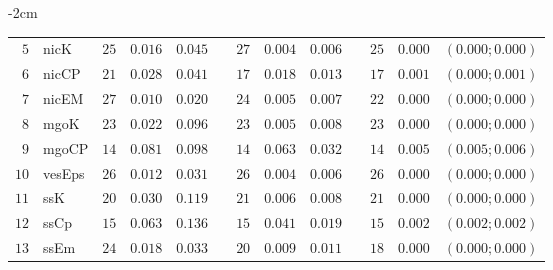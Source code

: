\begin{table*}[!htbp]
\begin{adjustwidth*}{}{-2cm}
\begin{tabular}{@{}rlrrrrrrrrrcc@{}}
\footnotesize{$5 $} & \footnotesize{nicK     } & \footnotesize{$25$} & \footnotesize{$0.016$} & \footnotesize{$0.045$} && \footnotesize{$27$} & \footnotesize{$0.004$} & \footnotesize{$0.006$} && \footnotesize{$25$} & \footnotesize{$0.000$} & \footnotesize{$(0.000;0.000)$} \\
\footnotesize{$6 $} & \footnotesize{nicCP    } & \footnotesize{$21$} & \footnotesize{$0.028$} & \footnotesize{$0.041$} && \footnotesize{$17$} & \footnotesize{$0.018$} & \footnotesize{$0.013$} && \footnotesize{$17$} & \footnotesize{$0.001$} & \footnotesize{$(0.000;0.001)$} \\
\footnotesize{$7 $} & \footnotesize{nicEM    } & \footnotesize{$27$} & \footnotesize{$0.010$} & \footnotesize{$0.020$} && \footnotesize{$24$} & \footnotesize{$0.005$} & \footnotesize{$0.007$} && \footnotesize{$22$} & \footnotesize{$0.000$} & \footnotesize{$(0.000;0.000)$} \\
\footnotesize{$8 $} & \footnotesize{mgoK     } & \footnotesize{$23$} & \footnotesize{$0.022$} & \footnotesize{$0.096$} && \footnotesize{$23$} & \footnotesize{$0.005$} & \footnotesize{$0.008$} && \footnotesize{$23$} & \footnotesize{$0.000$} & \footnotesize{$(0.000;0.000)$} \\
\footnotesize{$9 $} & \footnotesize{mgoCP    } & \footnotesize{$14$} & \footnotesize{$0.081$} & \footnotesize{$0.098$} && \footnotesize{$14$} & \footnotesize{$0.063$} & \footnotesize{$0.032$} && \footnotesize{$14$} & \footnotesize{$0.005$} & \footnotesize{$(0.005;0.006)$} \\
\footnotesize{$10$} & \footnotesize{vesEps   } & \footnotesize{$26$} & \footnotesize{$0.012$} & \footnotesize{$0.031$} && \footnotesize{$26$} & \footnotesize{$0.004$} & \footnotesize{$0.006$} && \footnotesize{$26$} & \footnotesize{$0.000$} & \footnotesize{$(0.000;0.000)$} \\
\footnotesize{$11$} & \footnotesize{ssK      } & \footnotesize{$20$} & \footnotesize{$0.030$} & \footnotesize{$0.119$} && \footnotesize{$21$} & \footnotesize{$0.006$} & \footnotesize{$0.008$} && \footnotesize{$21$} & \footnotesize{$0.000$} & \footnotesize{$(0.000;0.000)$} \\
\footnotesize{$12$} & \footnotesize{ssCp     } & \footnotesize{$15$} & \footnotesize{$0.063$} & \footnotesize{$0.136$} && \footnotesize{$15$} & \footnotesize{$0.041$} & \footnotesize{$0.019$} && \footnotesize{$15$} & \footnotesize{$0.002$} & \footnotesize{$(0.002;0.002)$} \\
\footnotesize{$13$} & \footnotesize{ssEm     } & \footnotesize{$24$} & \footnotesize{$0.018$} & \footnotesize{$0.033$} && \footnotesize{$20$} & \footnotesize{$0.009$} & \footnotesize{$0.011$} && \footnotesize{$18$} & \footnotesize{$0.000$} & \footnotesize{$(0.000;0.000)$} \\

\end{tabular}
\end{adjustwidth*}
\end{table*}
